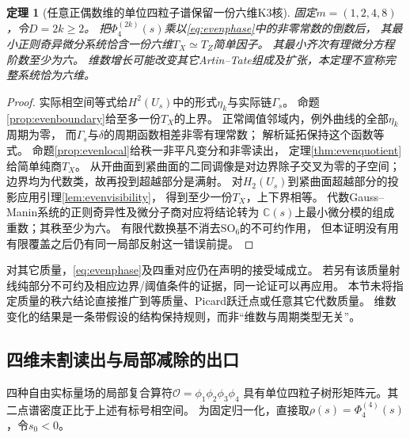 \documentclass[11pt,a4paper]{ctexart}
\theoremstyle{cnplain}\newtheorem{theorem}{定理}[section]
\theoremstyle{definition}\newtheorem{definition}[theorem]{定义}
\theoremstyle{remark}\newtheorem{remark}[theorem]{注}
\begin{document}
\begin{theorem}[任意正偶数维的单位四粒子谱保留一份六维K3核]\label{thm:evenk3visible}
固定$m=(1,2,4,8)$，令$D=2k\ge2$。
把$\Phi_4^{(2k)}(s)$乘以\eqref{eq:evenphase}中的非零常数的倒数后，
其最小正则奇异微分系统恰含一份六维$T_X\simeq T_Z$简单因子。
其最小齐次有理微分方程阶数至少为六。
维数增长可能改变其它Artin--Tate组成及扩张，本定理不宣称完整系统恰为六维。
\end{theorem}
\begin{proof}
实际相空间等式给$H^2(U_s)$中的形式$\eta_k$与实际链$\Gamma_s$。
命题\ref{prop:evenboundary}给至多一份$T_X$的上界。
正常阈值邻域内，例外曲线的全部$\eta_k$周期为零，
而$\Gamma_s$与$\delta$的周期函数相差非零有理常数；
解析延拓保持这个函数等式。
命题\ref{prop:evenlocal}给秩一非平凡变分和非零读出，
定理\ref{thm:evenquotient}给简单纯商$T_X$。
从开曲面到紧曲面的二同调像是对边界除子交叉为零的子空间；
边界均为代数类，故再投到超越部分是满射。
对$H_2(U_s)$到紧曲面超越部分的投影应用引理\ref{lem:evenvisibility}，
得到至少一份$T_X$，上下界相等。
代数Gauss--Manin系统的正则奇异性及微分子商对应将结论转为
$\mathbb C(s)$上最小微分模的组成重数；其秩至少为六。
有限代数换基不消去$\mathrm{SO}_6$的不可约作用，
但本证明没有用有限覆盖之后仍有同一局部反射这一错误前提。
\end{proof}

对其它质量，\eqref{eq:evenphase}及四重对应仍在声明的接受域成立。
若另有该质量射线纯部分不可约及相应边界/阈值条件的证据，同一论证可以再应用。
本节未将指定质量的秩六结论直接推广到等质量、Picard跃迁点或任意其它代数质量。
维数变化的结果是一条带假设的结构保持规则，而非“维数与周期类型无关”。

\subsection{四维未割读出与局部减除的出口}
四种自由实标量场的局部复合算符$\mathcal O=\phi_1\phi_2\phi_3\phi_4$
具有单位四粒子树形矩阵元。其二点谱密度正比于上述有标号相空间。
为固定归一化，直接取$\rho(s)=\Phi_4^{(4)}(s)$，令$s_0<0$。
\end{document}
